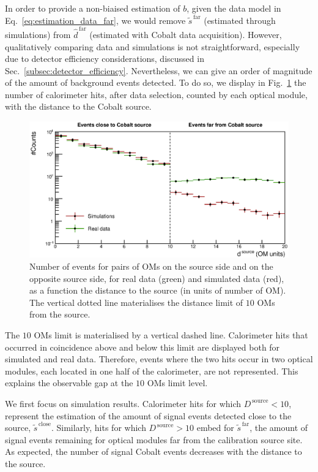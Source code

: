 In order to provide a non-biaised estimation of $b$, given the data model in Eq.~\eqref{eq:estimation_data_far}, we would remove $\tilde{s}^{\,\text{far}}$ (estimated through simulations) from $\hat{d}^{\,\text{far}}$ (estimated with Cobalt data acquisition).
However, qualitatively comparing data and simulations is not straightforward, especially due to detector efficiency considerations, discussed in Sec.~\ref{subsec:detector_efficiency}.
Nevertheless, we can give an order of magnitude of the amount of background events detected.
To do so, we display in Fig.~\ref{fig:Co_data_bkg} the number of calorimeter hits, after data selection, counted by each optical module, with the distance to the Cobalt source.
\begin{figure}[h]
  \centering
  \includegraphics[width=1.1\textwidth]{commissioning/fig_commissioning/Co_data_bkg.eps}
  \caption{Number of events for pairs of OMs on the source side and on the opposite source side, for real data (green) and simulated data (red), as a function the distance to the source (in units of number of OM).
    The vertical dotted line materialises the distance limit of $10$ OMs from the source.
    \label{fig:Co_data_bkg}}
\end{figure}
The $10$ OMs limit is materialised by a vertical dashed line.
Calorimeter hits that occurred in coincidence above and below this limit are displayed both for simulated and real data.
Therefore, events where the two hits occur in two optical modules, each located in one half of the calorimeter, are not represented.
This explains the observable gap at the $10$ OMs limit level.

We first focus on simulation results.
Calorimeter hits for which $D^{\,\text{source}}<10$, represent the estimation of the amount of signal events detected close to the source, $\tilde{s}^{\,\text{close}}$.
Similarly, hits for which $D^{\,\text{source}}>10$ embed for $\tilde{s}^{\,\text{far}}$, the amount of signal events remaining for optical modules far from the calibration source site.
As expected, the number of signal Cobalt events decreases with the distance to the source.

